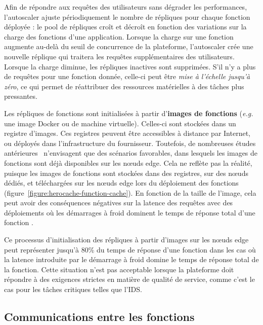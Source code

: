 Afin de répondre aux requêtes des utilisateurs sans dégrader les performances, l'autoscaler ajuste périodiquement le nombre de répliques pour chaque fonction déployée : le pool de répliques croît et décroît en fonction des variations sur la charge des fonctions d'une application. Lorsque la charge sur une fonction augmente au-delà du seuil de concurrence de la plateforme, l'autoscaler crée une nouvelle réplique qui traitera les requêtes supplémentaires des utilisateurs. Lorsque la charge diminue, les répliques inactives sont supprimées. S'il n'y a plus de requêtes pour une fonction donnée, celle-ci peut être \textit{mise à l'échelle jusqu'à zéro}, ce qui permet de réattribuer des ressources matérielles à des tâches plus pressantes.

Les répliques de fonctions sont initialisées à partir d'\textbf{images de fonctions} (\textit{e.g.} une image Docker ou de machine virtuelle). Celles-ci sont stockées dans un registre d'images. Ces registres peuvent être accessibles à distance par Internet, ou déployés dans l'infrastructure du fournisseur. Toutefois, de nombreuses études antérieures~\cite{bhasiCypressInputSizesensitive2022, zijunFassflowEfficient2022, smithFaDOFaaSFunctions2022, zhangFIRSTExploitingMultiDimensional2023} n'envisagent que des scénarios favorables, dans lesquels les images de fonctions sont déjà disponibles sur les nœuds edge. Cela ne reflète pas la réalité, puisque les images de fonctions sont stockées dans des registres, sur des nœuds dédiés, et téléchargées sur les nœuds edge lors du déploiement des fonctions (figure~\ref{figure:herocache-function-cache}). En fonction de la taille de l'image, cela peut avoir des conséquences négatives sur la latence des requêtes avec des déploiements où les démarrages à froid dominent le temps de réponse total d'une fonction \cite{yanHermesEfficientCache2020}.

Ce processus d'initialisation des répliques à partir d'images sur les nœuds edge peut représenter jusqu'à 80\% du temps de réponse d'une fonction \cite{yanHermesEfficientCache2020} dans les cas où la latence introduite par le démarrage à froid domine le temps de réponse total de la fonction. Cette situation n'est pas acceptable lorsque la plateforme doit répondre à des exigences strictes en matière de qualité de service, comme c'est le cas pour les tâches critiques telles que l'IDS.

\subsection{Communications entre les fonctions}
\label{section:herocache-background-communications}

